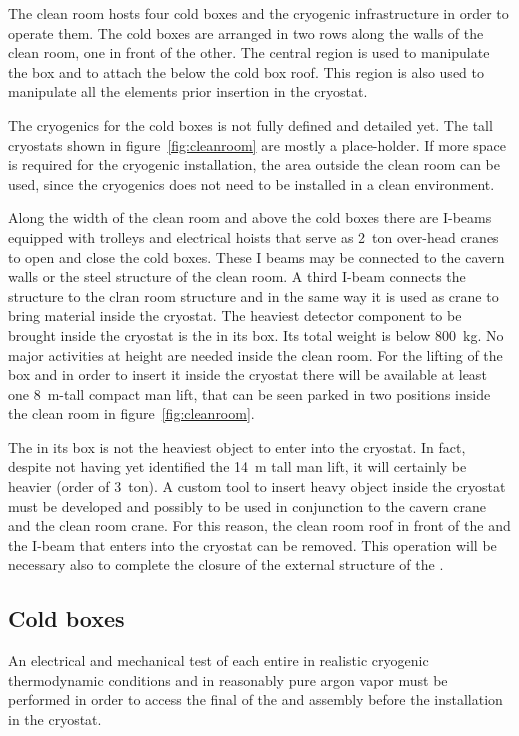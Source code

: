 The clean room hosts four cold boxes and the cryogenic infrastructure in order to operate them.
The cold boxes are arranged in two rows along the walls of the clean room, one in front of the other.
The central region is used to manipulate the  box and to attach the  below the cold box roof.
This region is also used to manipulate all the elements prior insertion in the cryostat.

The cryogenics for the cold boxes is not fully defined and detailed yet.
The tall cryostats shown in figure~\ref{fig:cleanroom} are mostly a place-holder.
If more space is required for the cryogenic installation, the area outside the clean room can be used, since the cryogenics does not need to be installed in a clean environment.

Along the width of the clean room and above the cold boxes there are I-beams equipped with trolleys and electrical hoists that serve as 2~ton over-head cranes to open and close the cold boxes.
These I beams may be connected to the cavern walls or the steel structure of the clean room.
A third I-beam connects the  structure to the clran room structure and in the same way it is used as crane to bring material inside the cryostat.
The heaviest detector component to be brought inside the cryostat is the  in its box.
Its total weight is below 800~kg.
No major activities at height are needed inside the clean room.
For the lifting of the  box and in order to insert it inside the cryostat there will be available at least one 8~m-tall compact man lift, that can be seen parked in two positions inside the clean room in figure~\ref{fig:cleanroom}.

The  in its box is not the heaviest object to enter into the cryostat.
In fact, despite not having yet identified the 14~m tall man lift, it will certainly be heavier (order of 3~ton).
A custom tool to insert heavy object inside the cryostat must be developed and possibly to be used in conjunction to the cavern crane and the clean room crane.
For this reason, the clean room roof in front of the  and the I-beam that enters into the cryostat can be removed.
This operation will be necessary also to complete the closure of the external structure of the .

\subsection{Cold boxes}
An electrical and mechanical test of each entire  in realistic cryogenic thermodynamic conditions and in reasonably pure argon vapor must be performed in order to access the final  of the  and  assembly before the installation in the cryostat.

